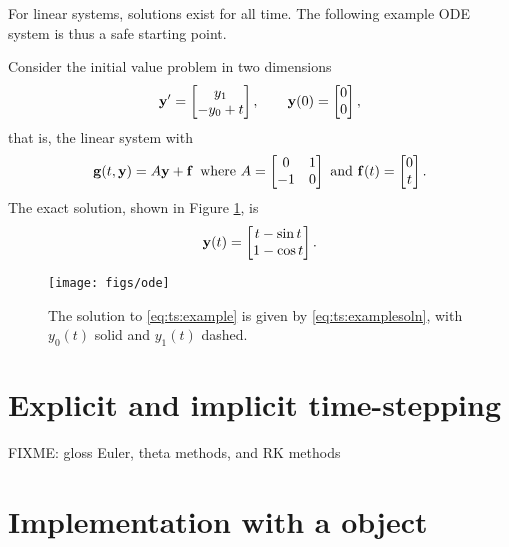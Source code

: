 For linear systems, solutions exist for all time.  The following example ODE system is thus a safe starting point.

\noindent\hrulefill
\begin{example}  Consider the initial value problem in two dimensions
\begin{equation}
   \mathbf{y}' = \begin{bmatrix} y_1 \\ - y_0 + t\end{bmatrix}, \qquad \mathbf{y}(0) = \begin{bmatrix} 0 \\ 0 \end{bmatrix}, \label{eq:ts:example}
\end{equation}
that is, the linear system with
    $$\mathbf{g}(t,\mathbf{y}) = A \mathbf{y} + \mathbf{f} \,\text{ where } A = \begin{bmatrix} 0 & 1 \\ -1 & 0 \end{bmatrix} \text{ and } \mathbf{f}(t) = \begin{bmatrix} 0 \\ t\end{bmatrix}.$$
The exact solution, shown in Figure \ref{fig:ts:ode}, is
\begin{equation}
    \mathbf{y}(t) = \begin{bmatrix} t - \sin t \\ 1 - \cos t \end{bmatrix}.\label{eq:ts:examplesoln}
\end{equation}

\vspace{-3mm}
\begin{figure}
\texttt{[image: figs/ode]}
\caption{The solution to \eqref{eq:ts:example} is given by \eqref{eq:ts:examplesoln}, with $y_0(t)$ solid and $y_1(t)$ dashed.}
\label{fig:ts:ode}
\end{figure}
\end{example}
\vspace{-5mm}
\noindent\hrulefill


\section{Explicit and implicit time-stepping}  FIXME: gloss Euler, theta methods, and RK methods


\section{Implementation with a \PETSc \pTS object}

